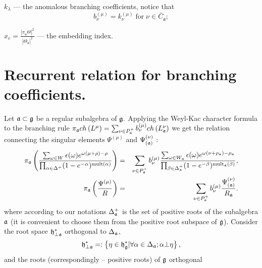 \documentclass[12pt]{iopart}
\theoremstyle{definition}
\theoremstyle{definition}
\theoremstyle{definition}
\theoremstyle{definition}
\begin{document}
 $k_{\lambda}$ --- the anomalous branching coefficients, notice that
\begin{equation}
  b^{(\mu)}_{\nu}=k^{(\mu)}_{\nu} \; \mbox{for} \; \nu\in \bar{C}_{\mathfrak{a}};
\label{eq:21-1}
\end{equation}

$x_e=\frac{\left|\pi_{\mathfrak{a}} \Theta\right|^2}{\left|\Theta_{\mathfrak{a}}\right|^2}$ --- the embedding index.

\section{Recurrent relation for branching coefficients.}
\label{sec:recurr-form-branch}

Let $\frak{a}\subset \frak{g}$ be a regular subalgebra of $\frak{g.}$
Applying the Weyl-Kac character formula to the branching rule $\pi _{\frak{a}%
}ch\left( L^{\mu }\right) =\sum_{\nu \in P_{\frak{a}}^{+}}b_{\nu }^{(\mu
)}ch\left( L_{\frak{a}}^{\nu }\right) $ we get the relation connecting the
singular elements $\Psi ^{\left( \mu \right) }$ and $\Psi _{\left( \frak{a}%
\right) }^{\left( \nu \right) }$ :
\begin{eqnarray}
\pi _{\frak{a}}\left( \frac{\sum_{\omega \in W}\epsilon (\omega )e^{\omega
(\mu +\rho )-\rho }}{\prod_{\alpha \in \Delta ^{+}}(1-e^{-\alpha })^{\mathrm{%
mult}(\alpha )}}\right) &=&\sum_{\nu \in P_{\frak{a}}^{+}}b_{\nu }^{(\mu )}%
\frac{\sum_{\omega \in W_{\frak{a}}}\epsilon (\omega )e^{\omega (\nu +\rho _{%
\frak{a}})-\rho _{\frak{a}}}}{\prod_{\beta \in \Delta _{\frak{a}%
}^{+}}(1-e^{-\beta })^{\mathrm{mult}_{\frak{a}}(\beta )}},  \label{eq:4} \\
\pi _{\frak{a}}\left( \frac{\Psi ^{\left( \mu \right) }}{R}\right)
&=&\sum_{\nu \in P_{\frak{a}}^{+}}b_{\nu }^{(\mu )}\frac{\Psi _{\left( \frak{%
a}\right) }^{\left( \nu \right) }}{R_{\frak{a}}}.
\end{eqnarray}
where according to our notations $\Delta _{\frak{a}}^{+}$ is the set of
positive roots of the subalgebra $\frak{a}$ (it is convenient to choose them
from the positive root subspace of $\frak{g}$). Consider the root space $%
\frak{h}_{\perp \frak{a}}^{\ast }$ orthogonal to $\Delta _{\frak{a}}$,
\begin{equation*}
\frak{h}_{\perp \frak{a}}^{\ast }=:\left\{ \eta \in \frak{h}_{\frak{g}%
}^{\ast }|\forall \alpha \in \Delta _{\frak{a}};\alpha \bot \eta \right\} ,
\end{equation*}
and the roots (correspondingly -- positive roots) of $\frak{g}$ orthogonal
\end{document}
